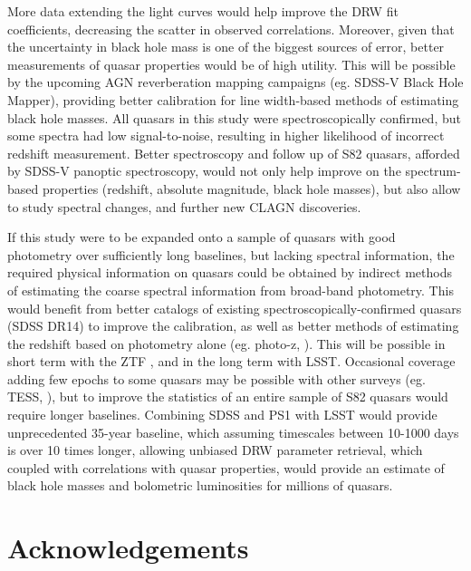 \documentclass[twocolumn]{aastex62}
\begin{document}
More data extending the light curves would help improve the DRW fit coefficients, decreasing the scatter in observed correlations. Moreover, given that the uncertainty in black hole mass is one of the biggest sources of error, better measurements of quasar properties would be of high utility\citep{shen2011}.  This will be possible by the upcoming AGN reverberation mapping campaigns (eg. SDSS-V Black Hole Mapper), providing better calibration for line width-based methods of estimating black hole masses\citep{kollmeier2017}. All quasars in this study were spectroscopically confirmed, but some spectra had low signal-to-noise, resulting in higher likelihood of incorrect redshift measurement. Better spectroscopy and follow up of S82 quasars, afforded by SDSS-V panoptic spectroscopy, would not only help improve on the spectrum-based  properties (redshift, absolute magnitude, black hole masses), but also allow to study spectral changes, and further new CLAGN discoveries. 

If this study were to be expanded onto a sample of quasars with good photometry over sufficiently long baselines, but lacking spectral information, the required physical information on quasars could be obtained by indirect methods of estimating the coarse spectral information from broad-band photometry\citep{kozlowski2015}. This would benefit from better catalogs of existing spectroscopically-confirmed quasars (SDSS DR14) to improve the calibration, as well as better methods of estimating the redshift based on photometry alone (eg. photo-z, \citealt{graham2018}).  This will be possible in short term with the ZTF \citep{bellm2018}, and in the long term with LSST\citep{ivezic2019}. Occasional coverage adding few epochs to some quasars may be possible with other surveys (eg. TESS, \citealt{ricker2014}), but to improve the statistics of an entire sample of S82 quasars would require longer baselines. Combining SDSS and PS1 with LSST would provide unprecedented 35-year baseline, which assuming timescales between 10-1000 days is over 10 times longer, allowing unbiased DRW parameter retrieval, which coupled with correlations with quasar properties, would provide an estimate of black hole masses and bolometric luminosities for millions of quasars\citep{ivezic2019}. 


\section{Acknowledgements}
\end{document}
